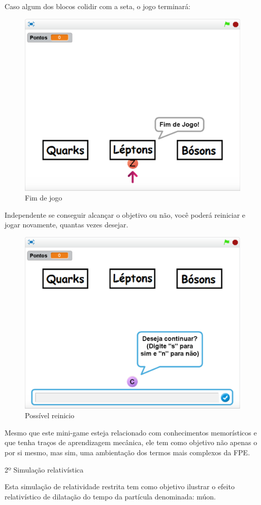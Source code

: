 \documentclass[12pt,fleqn]{book} %
\begin{document}
Caso algum dos blocos colidir com a seta, o jogo terminará:

\begin{figure}[h]
	\centering
	\includegraphics[width=0.63 \textwidth]{Produto/class7}
	\caption{Fim de jogo}
	\label{fig:app_a:class7}
\end{figure}

\newpage

Independente se conseguir alcançar o objetivo ou não, você poderá reiniciar e jogar novamente, quantas vezes desejar.

\begin{figure}[h]
	\centering
	\includegraphics[width=0.65 \textwidth]{Produto/class9}
	\caption{Possível reinicio}
	\label{fig:app_a:class9}
\end{figure}


Mesmo que este mini-game esteja relacionado com conhecimentos memorísticos e que tenha traços de aprendizagem mecânica, ele tem como objetivo não apenas o  por si mesmo, mas sim, uma ambientação dos termos mais complexos da FPE.

2º Simulação relativística

Esta simulação de relatividade restrita tem como objetivo ilustrar o efeito relativístico de dilatação do tempo da partícula denominada: múon.
\end{document}
